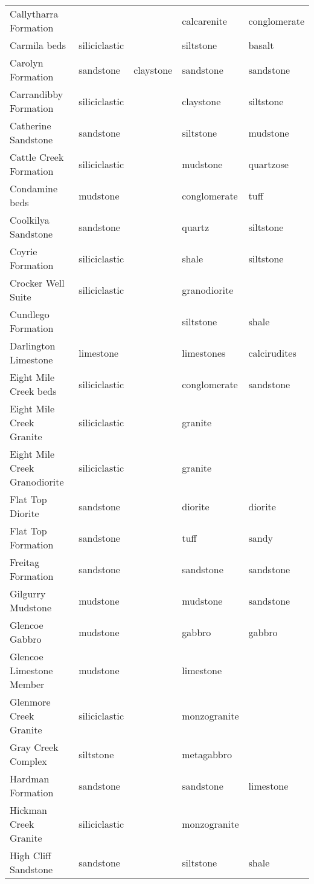 \begin{table}[ht]
\begin{tabular}{lllll}
  Callytharra Formation &  &  & calcarenite & conglomerate \\ 
  Carmila beds & siliciclastic &  & siltstone & basalt \\ 
  Carolyn Formation & sandstone & claystone & sandstone & sandstone \\ 
  Carrandibby Formation & siliciclastic &  & claystone & siltstone \\ 
  Catherine Sandstone & sandstone &  & siltstone & mudstone \\ 
  Cattle Creek Formation & siliciclastic &  & mudstone & quartzose \\ 
  Condamine beds & mudstone &  & conglomerate & tuff \\ 
  Coolkilya Sandstone & sandstone &  & quartz & siltstone \\ 
  Coyrie Formation & siliciclastic &  & shale & siltstone \\ 
  Crocker Well Suite & siliciclastic &  & granodiorite &  \\ 
  Cundlego Formation &  &  & siltstone & shale \\ 
  Darlington Limestone & limestone &  & limestones & calcirudites \\ 
  Eight Mile Creek beds & siliciclastic &  & conglomerate & sandstone \\ 
  Eight Mile Creek Granite & siliciclastic &  & granite &  \\ 
  Eight Mile Creek Granodiorite & siliciclastic &  & granite &  \\ 
  Flat Top Diorite & sandstone &  & diorite & diorite \\ 
  Flat Top Formation & sandstone &  & tuff & sandy \\ 
  Freitag Formation & sandstone &  & sandstone & sandstone \\ 
  Gilgurry Mudstone & mudstone &  & mudstone & sandstone \\ 
  Glencoe Gabbro & mudstone &  & gabbro & gabbro \\ 
  Glencoe Limestone Member & mudstone &  & limestone &  \\ 
  Glenmore Creek Granite & siliciclastic &  & monzogranite &  \\ 
  Gray Creek Complex & siltstone &  & metagabbro &  \\ 
  Hardman Formation & sandstone &  & sandstone & limestone \\ 
  Hickman Creek Granite & siliciclastic &  & monzogranite &  \\ 
  High Cliff Sandstone & sandstone &  & siltstone & shale \\ 

\end{tabular}
\end{table}
